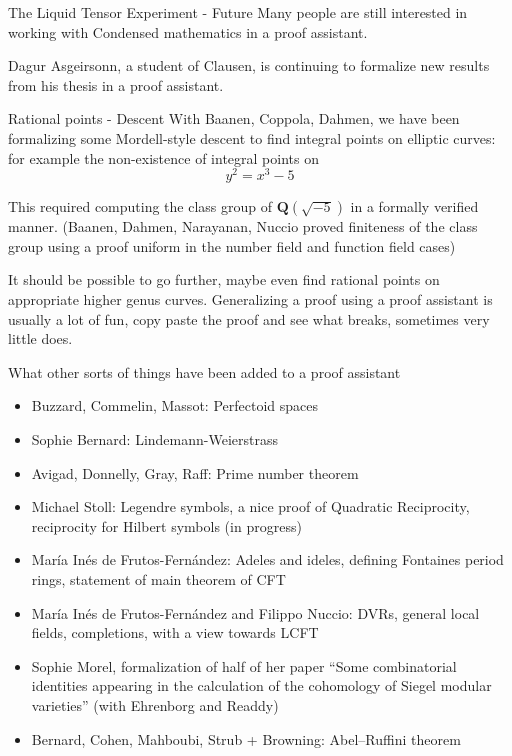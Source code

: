 \documentclass{beamer}
\theoremstyle{plain}
\newcommand{\QQ}{\mathbf Q}
\begin{document}
\begin{frame}{The Liquid Tensor Experiment - Future}
    Many people are still interested in working with Condensed mathematics in a proof assistant.

    Dagur Asgeirsonn, a student of Clausen, is continuing to formalize new results from his thesis in a proof assistant.
\end{frame}

\begin{frame}{Rational points - Descent}
    With Baanen, Coppola, Dahmen, we have been formalizing some Mordell-style descent to find integral points on elliptic curves: for example the non-existence of integral points on
    $$y^2 = x^3 - 5$$

    This required computing the class group of $\QQ(\sqrt{-5})$ in a formally verified manner.
    (Baanen, Dahmen, Narayanan, Nuccio proved finiteness of the class group using a proof uniform in the number field and function field cases)

    It should be possible to go further, maybe even find rational points on appropriate higher genus curves.
    Generalizing a proof using a proof assistant is usually a lot of fun,
    copy paste the proof and see what breaks, sometimes very little does.
\end{frame}


\begin{frame}{What other sorts of things have been added to a proof assistant}
    \begin{itemize}
        \item Buzzard, Commelin, Massot: Perfectoid spaces
        \item Sophie Bernard: Lindemann-Weierstrass
        \item Avigad, Donnelly, Gray, Raff: Prime number theorem
        \item Michael Stoll: Legendre symbols, a nice proof of Quadratic Reciprocity, reciprocity for Hilbert symbols (in progress)
        \item Mar\'ia In\'es de Frutos-Fern\'andez: Adeles and ideles, defining Fontaines period rings, statement of main theorem of CFT
        \item Mar\'ia In\'es de Frutos-Fern\'andez and Filippo Nuccio: DVRs, general local fields, completions, with a view towards LCFT
        \item Sophie Morel, formalization of half of her paper 
            ``Some combinatorial identities appearing in the calculation of the cohomology of Siegel modular varieties'' (with Ehrenborg and Readdy)
        \item Bernard, Cohen, Mahboubi, Strub + Browning: Abel--Ruffini theorem
    \end{itemize}
\end{frame}
\end{document}

